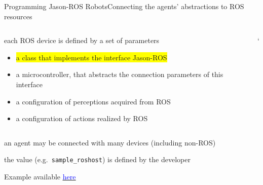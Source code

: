 \documentclass[compress]{beamer}
\newcommand{\link}[2]{\href{#1}{\underline{\textcolor{blue}{#2}}}}
\begin{document}
\begin{frame}[fragile]{Programming Jason-ROS Robots}{Connecting the agents' abstractions to ROS resources}
\begin{columns}
\begin{column}{.55\textwidth}
            each ROS device is defined by a set of parameters
            \begin{itemize}\tiny
                \item\colorbox{yellow}{a class that implements the interface Jason-ROS}
                \item a microcontroller, that abstracts the connection parameters of this interface
                \item a configuration of perceptions acquired from ROS
                \item a configuration of actions realized by ROS
            \end{itemize}
        \end{column}`      
    \end{columns}
  
  
    \vspace{.3cm}
  
    an agent may be connected with many devices {\tiny (including non-ROS)}\\ \vspace{-.2cm}
  
    the value (e.g.~\texttt{sample\_roshost}) is defined by the developer
    
    \vfill
    {\tiny Example available \link{https://github.com/issia-2026-jason-ros/turtle-example/blob/master/src/agt/robot1.yaml}{here}}
    
\end{frame}
\end{document}
